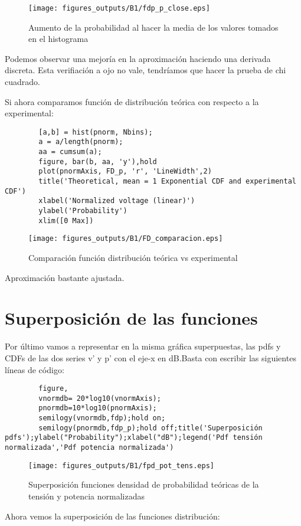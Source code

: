\documentclass{article}
\begin{document}
        \clearpage
         \begin{figure}[h]
         \centering
         \texttt{[image: figures\_outputs/B1/fdp\_p\_close.eps]}
         \caption{Aumento de la probabilidad al hacer la media de los valores tomados en el histograma}
         \label{fig:my_label}
     \end{figure}
     \par Podemos observar una mejoría en la aproximación haciendo una derivada discreta. Esta verifiación a ojo no vale, tendríamos que hacer la prueba de chi cuadrado.
    \par Si ahora comparamos función de distribución teórica con respecto a la experimental:
    \begin{lstlisting}
        [a,b] = hist(pnorm, Nbins);
        a = a/length(pnorm);
        aa = cumsum(a);
        figure, bar(b, aa, 'y'),hold
        plot(pnormAxis, FD_p, 'r', 'LineWidth',2)
        title('Theoretical, mean = 1 Exponential CDF and experimental CDF')
        xlabel('Normalized voltage (linear)')
        ylabel('Probability')
        xlim([0 Max])
    \end{lstlisting} 
     
    \begin{figure}[h]
        \centering
        \texttt{[image: figures\_outputs/B1/FD\_comparacion.eps]}
        \caption{Comparación función distribución teórica vs experimental}
        \label{fig:my_label}
    \end{figure}
    \par Aproximación bastante ajustada.
    \clearpage
\section{Superposición de las funciones}
    \par Por último vamos a representar en la misma gráfica superpuestas, las pdfs y CDFs de las dos series v' y p' con el eje-x en dB.Basta con escribir las siguientes líneas de código:
    \begin{lstlisting}
        figure,
        vnormdb= 20*log10(vnormAxis);
        pnormdb=10*log10(pnormAxis);
        semilogy(vnormdb,fdp);hold on;
        semilogy(pnormdb,fdp_p);hold off;title('Superposición pdfs');ylabel("Probability");xlabel("dB");legend('Pdf tensión normalizada','Pdf potencia normalizada')
    \end{lstlisting}
    \begin{figure}[h]
        \centering
        \texttt{[image: figures\_outputs/B1/fpd\_pot\_tens.eps]}
        \caption{Superposición funciones densidad de probabilidad teóricas de la tensión y potencia normalizadas}
        \label{fig:my_label}
    \end{figure}
    \par Ahora vemos la superposición de las funciones distribución:
    
\end{document}

